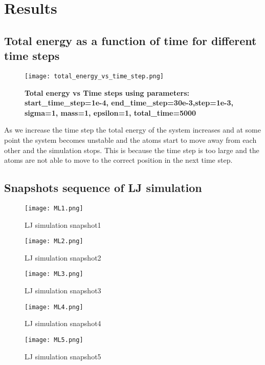 \chapter{Results}\label{chap:results}

\section{Total energy as a function of time for different time steps}
    \graphicspath{ {./figures/milestone04/} }
    \begin{figure}[!htb]
    \centering
        \texttt{[image: total\_energy\_vs\_time\_step.png]}
        \caption[Total energy vs Time steps using parameters]{\textbf{Total energy vs Time steps using parameters: start\_time\_step=1e-4, end\_time\_step=30e-3,step=1e-3, sigma=1, mass=1, epsilon=1, total\_time=5000}}
    \label{fig:total_energy_vs_time_step}
    \end{figure}
As we increase the time step the total energy of the system increases and at some point the system becomes unstable and the atoms start to move away from each other
and the simulation stops. This is because the time step is too large and the atoms are not able to move to the correct position in the next time step.


\section{Snapshots sequence of LJ simulation}
    \graphicspath{ {./figures/milestone04/} }
    \begin{figure}[h]

    \centering
        \texttt{[image: ML1.png]}
        \caption{LJ simulation snapshot1}
    \label{fig:step1}
    \end{figure}
    \begin{figure}[!htb]
    \centering
        \texttt{[image: ML2.png]}
        \caption{LJ simulation snapshot2}
    \label{fig:step2}
    \end{figure}
    \begin{figure}[!htb]
    \centering
        \texttt{[image: ML3.png]}
        \caption{LJ simulation snapshot3}
    \label{fig:step3}
    \end{figure}
    \begin{figure}[!htb]
    \centering
        \texttt{[image: ML4.png]}
        \caption{LJ simulation snapshot4}
    \label{fig:step4}
    \end{figure}
    \begin{figure}[!htb]
    \centering
        \texttt{[image: ML5.png]}
        \caption{LJ simulation snapshot5}
    \label{fig:step5}
    \end{figure}



